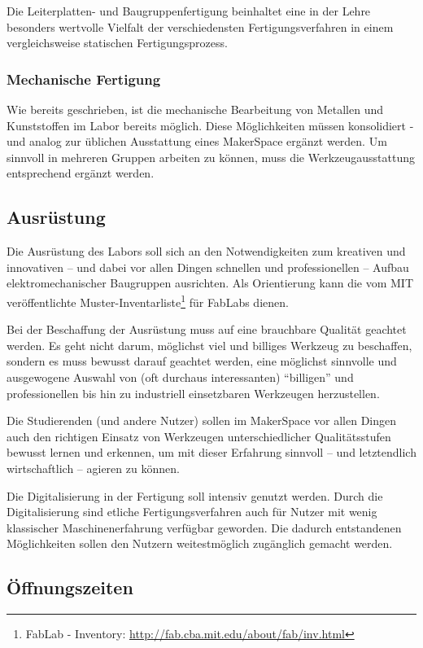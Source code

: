 \documentclass[parskip=half,headsepline,footsepline,titlepage]{scrartcl}
\begin{document}
Die Leiterplatten- und Baugruppenfertigung beinhaltet eine in der Lehre besonders wertvolle Vielfalt der verschiedensten Fertigungsverfahren in einem vergleichsweise statischen Fertigungsprozess.

\subsubsection{Mechanische Fertigung}
Wie bereits geschrieben, ist die mechanische Bearbeitung von Metallen und Kunststoffen im Labor bereits möglich. Diese Möglichkeiten müssen konsolidiert - und analog zur üblichen Ausstattung eines MakerSpace ergänzt werden.
Um sinnvoll in mehreren Gruppen arbeiten zu können, muss die Werkzeugausstattung entsprechend ergänzt werden.

\subsection{Ausrüstung}
Die Ausrüstung des Labors soll sich an den Notwendigkeiten zum kreativen und innovativen -- und dabei vor allen Dingen schnellen und professionellen -- Aufbau elektromechanischer Baugruppen ausrichten. Als Orientierung kann die vom MIT veröffentlichte Muster-Inventarliste\footnote{FabLab - Inventory: \url{http://fab.cba.mit.edu/about/fab/inv.html}} für FabLabs dienen. %

Bei der Beschaffung der Ausrüstung muss auf eine brauchbare Qualität geachtet werden. Es geht nicht darum, möglichst viel und billiges Werkzeug zu beschaffen, sondern es muss bewusst darauf geachtet werden, eine möglichst sinnvolle und ausgewogene Auswahl von (oft durchaus interessanten) ``billigen'' und professionellen bis hin zu industriell einsetzbaren Werkzeugen herzustellen.

Die Studierenden (und andere Nutzer) sollen im MakerSpace vor allen Dingen auch den richtigen Einsatz von Werkzeugen unterschiedlicher Qualitätsstufen bewusst lernen und erkennen, um mit dieser Erfahrung sinnvoll -- und letztendlich wirtschaftlich -- agieren zu können.

Die Digitalisierung in der Fertigung soll intensiv genutzt werden. Durch die Digitalisierung sind etliche Fertigungsverfahren auch für Nutzer mit wenig klassischer Maschinenerfahrung verfügbar geworden. Die dadurch entstandenen Möglichkeiten sollen den Nutzern weitestmöglich zugänglich gemacht werden.


\subsection{Öffnungszeiten}
\end{document}
